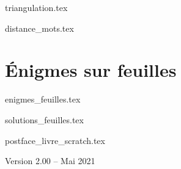 \documentclass[10pt,twoside]{report}
\begin{document}
{triangulation.tex}

{distance_mots.tex}

\clearemptydoublepage
\setcounter{chapter}{0}

\part{Énigmes sur feuilles}

{enigmes_feuilles.tex}

{solutions_feuilles.tex}



{postface_livre_scratch.tex}

\vfill


\centerline{Version 2.00 -- Mai 2021}
\end{document}
